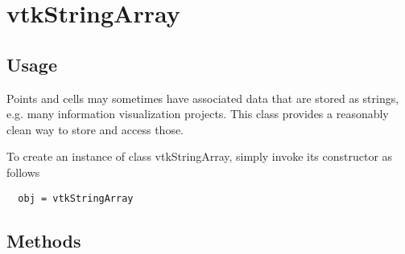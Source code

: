 \section{vtkStringArray}

\subsection{Usage}

 Points and cells may sometimes have associated data that are stored
 as strings, e.g. many information visualization projects.  This
 class provides a reasonably clean way to store and access those.



To create an instance of class vtkStringArray, simply
invoke its constructor as follows
\begin{verbatim}
  obj = vtkStringArray
\end{verbatim}
\subsection{Methods}

